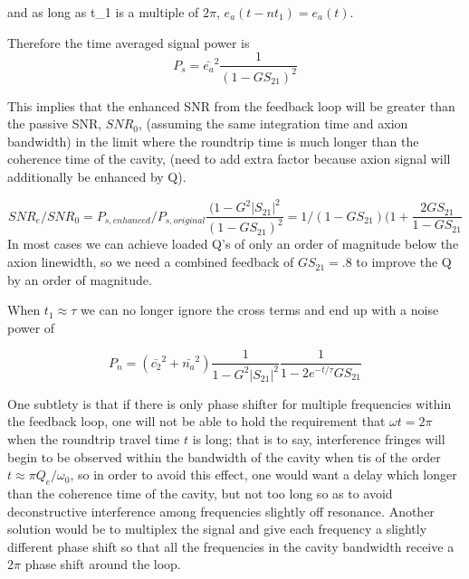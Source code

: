 \documentclass[aps,prl,twocolumn,groupedaddress]{revtex4-1}
\begin{document}
and as long as \omega t_1 is a multiple of $2\pi$, $e_a(t-nt_1) = e_a(t)$.

Therefore the time averaged signal power is
\begin{equation}
P_s = \bar{e_a}^2\frac{1}{(1 - GS_{21})^2}
\end{equation}

This implies that the enhanced SNR from the feedback loop will be greater than the passive SNR, $SNR_0$, (assuming the same integration time and axion bandwidth) in the limit where the roundtrip time is much longer than the coherence time of the cavity, (need to add extra factor because axion signal will additionally be enhanced by Q).

\begin{equation}
SNR_{e}/SNR_{0} =P_{s, enhanced}/P_{s,original}\frac{(1-G^2|S_{21}|^2}{(1-GS_{21})^2} = 1/(1-GS_{21})(1 + \frac{2GS_{21}}{1-GS_{21}}
\end{equation}
In most cases we can achieve loaded Q's of only an order of magnitude below the axion linewidth, so we need a combined feedback of $GS_{21} = .8$ to improve the Q by an order of magnitude.

When $t_1 \approx \tau$ we can no longer ignore the cross terms and end up with a noise power of

\begin{equation}
P_n = (\bar{c_2}^2 + \bar{n_a}^2)\frac{1}{1 - G^2|S_{21}|^2}\frac{1}{1-2e^{-t/\tau}GS_{21}}
\end{equation}

One subtlety is that if there is only phase shifter for multiple frequencies within the feedback loop, one will not be able to hold the requirement that $\omega t = 2\pi$ when the roundtrip travel time $t$ is long; that is to say, interference fringes will begin to be observed within the bandwidth of the cavity when tis of the order $t \approx \pi Q_e / \omega_0$, so in order to avoid this effect, one would want a delay which longer than the coherence time of the cavity, but not too long so as to avoid deconstructive interference among frequencies slightly off resonance. Another solution would be to multiplex the signal and give each frequency a slightly different phase shift so that all the frequencies in the cavity bandwidth receive a 2$\pi$ phase shift around the loop.
\end{document}
